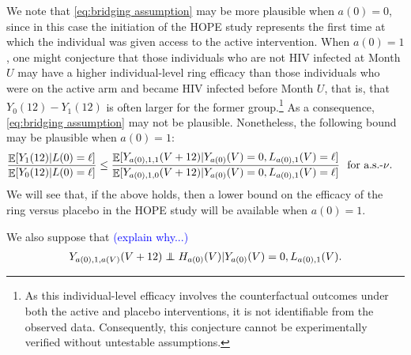 \documentclass[12pt]{article}
\theoremstyle{definition}
\newcommand\independent{\protect\mathpalette{\protect\independenT}{\perp}}
\def\independenT#1#2{\mathrel{\rlap{$#1#2$}\mkern2mu{#1#2}}}
\DeclareMathOperator{\cE}{\mathbb{E}}
\newcommand{\Hopen}{V}
\begin{document}
We note that \eqref{eq:bridging assumption} may be more plausible when $a(0)=0$, since in this case the initiation of the HOPE study represents the first time at which the individual was given access to the active intervention. When $a(0)=1$, one might conjecture that those individuals who are not HIV infected at Month $U$ may have a higher individual-level ring efficacy than those individuals who were on the active arm and became HIV infected before Month $U$, that is, that $Y_0(12)-Y_1(12)$ is often larger for the former group.\footnote{As this individual-level efficacy involves the counterfactual outcomes under both the active and placebo interventions, it is not identifiable from the observed data. Consequently, this conjecture cannot be experimentally verified without untestable assumptions.} As a consequence, \eqref{eq:bridging assumption} may not be plausible. Nonetheless, the following bound may be plausible when $a(0)=1$:
\begin{align}
    \frac{\cE[Y_{1}(12)|L(0)=\ell]}{\cE[Y_{0}(12)|L(0)=\ell]}&\le \frac{\cE[Y_{a(0),1,1}(\Hopen+12)|Y_{a(0)}(\Hopen)=0,L_{a(0),1}(\Hopen)=\ell]}{\cE[Y_{a(0),1,0}(\Hopen+12)|Y_{a(0)}(\Hopen)=0,L_{a(0),1}(\Hopen)=\ell]}\ \textnormal{ for a.s.-$\nu$}. \label{eq:bridging assumption bound}
\end{align}
We will see that, if the above holds, then a lower bound on the efficacy of the ring versus placebo in the HOPE study will be available when $a(0)=1$.

We also suppose that \textcolor{blue}{(explain why...)}
\begin{align}
    Y_{a(0),1, a(V)}(\Hopen+12)\independent H_{a(0)}(\Hopen) | Y_{a(0)}(\Hopen)=0,L_{a(0),1}(\Hopen). \label{eq:Hindep}
\end{align}
\end{document}
